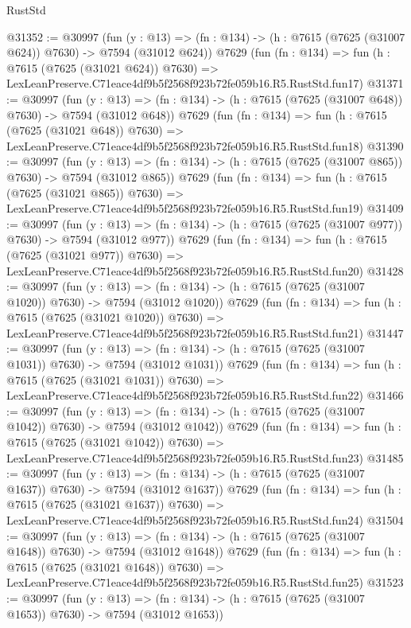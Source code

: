 \begin{lexlean}{RustStd}
\begin{coremodule}
@31352 := @30997
    (fun (y : @13) => (fn : @134) -> (h : @7615 (@7625 (@31007 @624)) @7630) -> @7594 (@31012 @624))
    @7629
    (fun (fn : @134) =>
    fun (h : @7615 (@7625 (@31021 @624)) @7630) =>
    LexLeanPreserve.C71eace4df9b5f2568f923b72fe059b16.R5.RustStd.fun17)
@31371 := @30997
    (fun (y : @13) => (fn : @134) -> (h : @7615 (@7625 (@31007 @648)) @7630) -> @7594 (@31012 @648))
    @7629
    (fun (fn : @134) =>
    fun (h : @7615 (@7625 (@31021 @648)) @7630) =>
    LexLeanPreserve.C71eace4df9b5f2568f923b72fe059b16.R5.RustStd.fun18)
@31390 := @30997
    (fun (y : @13) => (fn : @134) -> (h : @7615 (@7625 (@31007 @865)) @7630) -> @7594 (@31012 @865))
    @7629
    (fun (fn : @134) =>
    fun (h : @7615 (@7625 (@31021 @865)) @7630) =>
    LexLeanPreserve.C71eace4df9b5f2568f923b72fe059b16.R5.RustStd.fun19)
@31409 := @30997
    (fun (y : @13) => (fn : @134) -> (h : @7615 (@7625 (@31007 @977)) @7630) -> @7594 (@31012 @977))
    @7629
    (fun (fn : @134) =>
    fun (h : @7615 (@7625 (@31021 @977)) @7630) =>
    LexLeanPreserve.C71eace4df9b5f2568f923b72fe059b16.R5.RustStd.fun20)
@31428 := @30997
    (fun (y : @13) =>
    (fn : @134) -> (h : @7615 (@7625 (@31007 @1020)) @7630) -> @7594 (@31012 @1020))
    @7629
    (fun (fn : @134) =>
    fun (h : @7615 (@7625 (@31021 @1020)) @7630) =>
    LexLeanPreserve.C71eace4df9b5f2568f923b72fe059b16.R5.RustStd.fun21)
@31447 := @30997
    (fun (y : @13) =>
    (fn : @134) -> (h : @7615 (@7625 (@31007 @1031)) @7630) -> @7594 (@31012 @1031))
    @7629
    (fun (fn : @134) =>
    fun (h : @7615 (@7625 (@31021 @1031)) @7630) =>
    LexLeanPreserve.C71eace4df9b5f2568f923b72fe059b16.R5.RustStd.fun22)
@31466 := @30997
    (fun (y : @13) =>
    (fn : @134) -> (h : @7615 (@7625 (@31007 @1042)) @7630) -> @7594 (@31012 @1042))
    @7629
    (fun (fn : @134) =>
    fun (h : @7615 (@7625 (@31021 @1042)) @7630) =>
    LexLeanPreserve.C71eace4df9b5f2568f923b72fe059b16.R5.RustStd.fun23)
@31485 := @30997
    (fun (y : @13) =>
    (fn : @134) -> (h : @7615 (@7625 (@31007 @1637)) @7630) -> @7594 (@31012 @1637))
    @7629
    (fun (fn : @134) =>
    fun (h : @7615 (@7625 (@31021 @1637)) @7630) =>
    LexLeanPreserve.C71eace4df9b5f2568f923b72fe059b16.R5.RustStd.fun24)
@31504 := @30997
    (fun (y : @13) =>
    (fn : @134) -> (h : @7615 (@7625 (@31007 @1648)) @7630) -> @7594 (@31012 @1648))
    @7629
    (fun (fn : @134) =>
    fun (h : @7615 (@7625 (@31021 @1648)) @7630) =>
    LexLeanPreserve.C71eace4df9b5f2568f923b72fe059b16.R5.RustStd.fun25)
@31523 := @30997
    (fun (y : @13) =>
    (fn : @134) -> (h : @7615 (@7625 (@31007 @1653)) @7630) -> @7594 (@31012 @1653))

\end{coremodule}
\end{lexlean}
